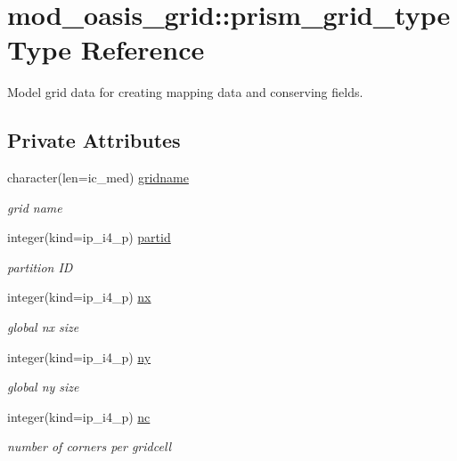 \hypertarget{structmod__oasis__grid_1_1prism__grid__type}{\section{mod\+\_\+oasis\+\_\+grid\+:\+:prism\+\_\+grid\+\_\+type Type Reference}
\label{structmod__oasis__grid_1_1prism__grid__type}
}


Model grid data for creating mapping data and conserving fields.  


\subsection*{Private Attributes}
\begin{DoxyCompactItemize}
\item 
character(len=ic\+\_\+med) \hyperlink{structmod__oasis__grid_1_1prism__grid__type_a51bf2e1319c04ec74a7787da72a0535b}{gridname}
\begin{DoxyCompactList}\small\item\em grid name \end{DoxyCompactList}\item 
integer(kind=ip\+\_\+i4\+\_\+p) \hyperlink{structmod__oasis__grid_1_1prism__grid__type_a8638cf8b735e72872be089682d0f8340}{partid}
\begin{DoxyCompactList}\small\item\em partition I\+D \end{DoxyCompactList}\item 
integer(kind=ip\+\_\+i4\+\_\+p) \hyperlink{structmod__oasis__grid_1_1prism__grid__type_ad27a1fc4d01d2b69f95d7cf9bcdbe571}{nx}
\begin{DoxyCompactList}\small\item\em global nx size \end{DoxyCompactList}\item 
integer(kind=ip\+\_\+i4\+\_\+p) \hyperlink{structmod__oasis__grid_1_1prism__grid__type_ad12673fd6c928ed6441e5584c16d0a3e}{ny}
\begin{DoxyCompactList}\small\item\em global ny size \end{DoxyCompactList}\item 
integer(kind=ip\+\_\+i4\+\_\+p) \hyperlink{structmod__oasis__grid_1_1prism__grid__type_a9a562f1211ac03c0b308f156a9c88e39}{nc}
\begin{DoxyCompactList}\small\item\em number of corners per gridcell \end{DoxyCompactList}\item 

\end{DoxyCompactItemize}
